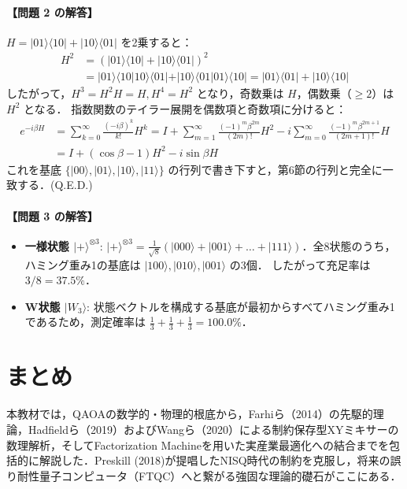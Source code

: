 \documentclass[11pt,a4paper,oneside,openany]{ltjsbook}
\theoremstyle{definition}
\theoremstyle{plain}
\theoremstyle{remark}
\newcommand{\ket}[1]{|#1\rangle}
\newcommand{\bra}[1]{\langle#1|}
\newcommand{\braket}[2]{\langle#1|#2\rangle}
\begin{document}
\subsubsection*{【問題 2 の解答】}
$H = \ket{01}\bra{10} + \ket{10}\bra{01}$ を2乗すると：
\begin{align*}
    H^2 &= (\ket{01}\bra{10} + \ket{10}\bra{01})^2 \\
    &= \ket{01}\braket{10}{10}\bra{01} + \ket{10}\braket{01}{01}\bra{10} = \ket{01}\bra{01} + \ket{10}\bra{10}
\end{align*}
したがって，$H^3 = H^2 H = H, H^4 = H^2$ となり，奇数乗は $H$，偶数乗（$\ge 2$）は $H^2$ となる．
指数関数のテイラー展開を偶数項と奇数項に分けると：
\begin{align*}
    e^{-i \beta H} &= \sum_{k=0}^\infty \frac{(-i \beta)^k}{k!} H^k = I + \sum_{m=1}^\infty \frac{(-1)^m \beta^{2m}}{(2m)!} H^2 - i \sum_{m=0}^\infty \frac{(-1)^m \beta^{2m+1}}{(2m+1)!} H \\
    &= I + (\cos\beta - 1) H^2 - i \sin\beta H
\end{align*}
これを基底 $\{\ket{00}, \ket{01}, \ket{10}, \ket{11}\}$ の行列で書き下すと，第6節の行列と完全に一致する．\quad (Q.E.D.)

\subsubsection*{【問題 3 の解答】}
\begin{itemize}
    \item \textbf{一様状態 $\ket{+}^{\otimes 3}$}:
          $\ket{+}^{\otimes 3} = \frac{1}{\sqrt{8}} (\ket{000} + \ket{001} + \dots + \ket{111})$．全8状態のうち，ハミング重み1の基底は $\ket{100}, \ket{010}, \ket{001}$ の3個．
          したがって充足率は $3/8 = \mathbf{37.5\%}$．
    \item \textbf{W状態 $\ket{W_3}$}:
          状態ベクトルを構成する基底が最初からすべてハミング重み1であるため，測定確率は $\frac{1}{3} + \frac{1}{3} + \frac{1}{3} = \mathbf{100.0\%}$．
\end{itemize}

\chapter{まとめ}

本教材では，QAOAの数学的・物理的根底から，Farhiら（2014）\cite{farhi2014quantum}の先駆的理論，Hadfieldら（2019）\cite{hadfield2019from}およびWangら（2020）\cite{wang2020xy}による制約保存型XYミキサーの数理解析，そしてFactorization Machineを用いた実産業最適化への結合\cite{kitai2020designing}までを包括的に解説した．Preskill (2018)\cite{preskill2018quantum}が提唱したNISQ時代の制約を克服し，将来の誤り耐性量子コンピュータ（FTQC）へと繋がる強固な理論的礎石がここにある．
\end{document}
